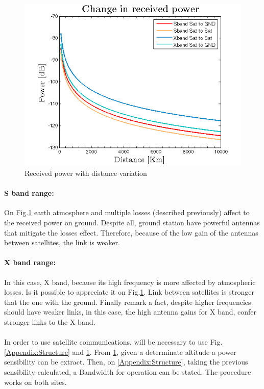 \begin{figure}[h]
	\includegraphics[scale=0.9]{./sections/SatelliteDept/sections/images/friisCases}
	\centering
	\caption{Received power with distance variation}
	\label{friis}
\end{figure}
\paragraph{S band range:} On Fig.\ref{friis} earth atmosphere and multiple losses (described previously) affect to the received power on ground. Despite all, ground station have powerful antennas that mitigate the losses effect. Therefore, because of the low gain of the antennas between satellites, the link is weaker.
\paragraph{X band range:} In this case, X band, because its high frequency is more affected by atmospheric losses. Is it possible to appreciate it on Fig.\ref{friis}. Link between satellites is stronger that the one with the ground. Finally remark a fact, despite higher frequencies should have weaker links, in this case, the high antenna gains for X band, confer stronger links to the X band.

\paragraph{}In order to use satellite communications, will be necessary to use Fig.\ref{Appendix:Structure} and \ref{friis}. From \ref{friis}, given a determinate altitude a power sensibility can be extract. Then, on \ref{Appendix:Structure}, taking the previous sensibility calculated, a Bandwidth for operation can be stated. The procedure works on both sites.
